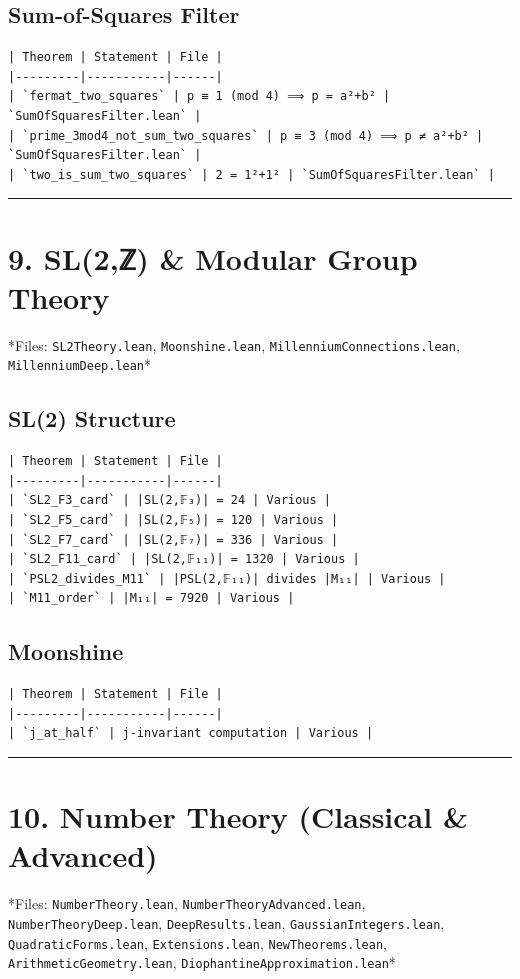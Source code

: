 \documentclass[12pt,a4paper,openany]{book}
\begin{document}
\subsection{Sum-of-Squares Filter}
\begin{verbatim}
| Theorem | Statement | File |
|---------|-----------|------|
| `fermat_two_squares` | p ≡ 1 (mod 4) ⟹ p = a²+b² | `SumOfSquaresFilter.lean` |
| `prime_3mod4_not_sum_two_squares` | p ≡ 3 (mod 4) ⟹ p ≠ a²+b² | `SumOfSquaresFilter.lean` |
| `two_is_sum_two_squares` | 2 = 1²+1² | `SumOfSquaresFilter.lean` |
\end{verbatim}

\bigskip\hrule\bigskip

\section{9. SL(2,ℤ) \& Modular Group Theory}

*Files: \texttt{SL2Theory.lean}, \texttt{Moonshine.lean}, \texttt{MillenniumConnections.lean}, \texttt{MillenniumDeep.lean}*

\subsection{SL(2) Structure}
\begin{verbatim}
| Theorem | Statement | File |
|---------|-----------|------|
| `SL2_F3_card` | |SL(2,𝔽₃)| = 24 | Various |
| `SL2_F5_card` | |SL(2,𝔽₅)| = 120 | Various |
| `SL2_F7_card` | |SL(2,𝔽₇)| = 336 | Various |
| `SL2_F11_card` | |SL(2,𝔽₁₁)| = 1320 | Various |
| `PSL2_divides_M11` | |PSL(2,𝔽₁₁)| divides |M₁₁| | Various |
| `M11_order` | |M₁₁| = 7920 | Various |
\end{verbatim}

\subsection{Moonshine}
\begin{verbatim}
| Theorem | Statement | File |
|---------|-----------|------|
| `j_at_half` | j-invariant computation | Various |
\end{verbatim}

\bigskip\hrule\bigskip

\section{10. Number Theory (Classical \& Advanced)}

*Files: \texttt{NumberTheory.lean}, \texttt{NumberTheoryAdvanced.lean}, \texttt{NumberTheoryDeep.lean}, \texttt{DeepResults.lean}, \texttt{GaussianIntegers.lean}, \texttt{QuadraticForms.lean}, \texttt{Extensions.lean}, \texttt{NewTheorems.lean}, \texttt{ArithmeticGeometry.lean}, \texttt{DiophantineApproximation.lean}*
\end{document}
